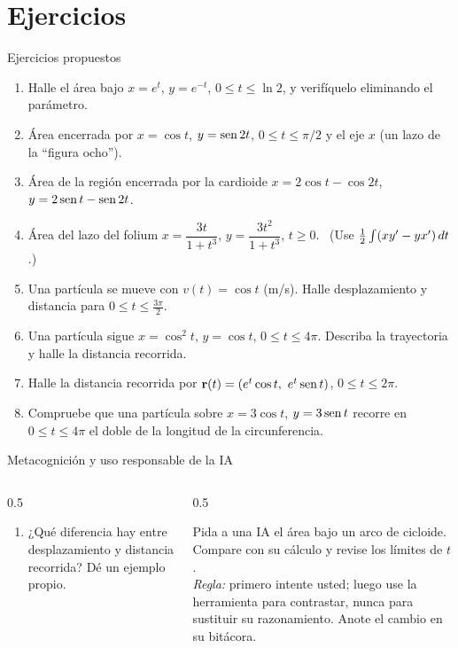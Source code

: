 \documentclass[10pt,aspectratio=169]{beamer}
\begin{document}
\section{Ejercicios}

\begin{frame}{Ejercicios propuestos}
  \begin{ejercicio}
    \begin{enumerate}
      \item Halle el área bajo $x=e^t$, $y=e^{-t}$, $0\le t\le\ln2$, y verifíquelo eliminando el parámetro.
      \item Área encerrada por $x=\cos t$, $y=\operatorname{sen}2t$, $0\le t\le\pi/2$ y el eje $x$ (un lazo de la ``figura ocho'').
      \item Área de la región encerrada por la cardioide $x=2\cos t-\cos2t$, $y=2\operatorname{sen} t-\operatorname{sen}2t$.
      \item Área del lazo del folium $x=\dfrac{3t}{1+t^3}$, $y=\dfrac{3t^2}{1+t^3}$, $t\ge0$.
        \ \small(Use $\frac12\int(xy'-yx')\,dt$.)
      \item Una partícula se mueve con $v(t)=\cos t$ (m/s). Halle desplazamiento y distancia para $0\le t\le\frac{3\pi}{2}$.
      \item Una partícula sigue $x=\cos^2t$, $y=\cos t$, $0\le t\le4\pi$. Describa la trayectoria y halle la distancia recorrida.
      \item Halle la distancia recorrida por $\mathbf r(t)=(e^t\cos t,\ e^t\operatorname{sen} t)$, $0\le t\le2\pi$.
      \item Compruebe que una partícula sobre $x=3\cos t$, $y=3\operatorname{sen} t$ recorre en $0\le t\le 4\pi$ el doble de la longitud de la circunferencia.
    \end{enumerate}
  \end{ejercicio}
\end{frame}

\begin{frame}{Metacognición y uso responsable de la IA}
  \small
  \begin{columns}[t]
    \begin{column}{0.5\textwidth}
      \begin{metacog}
        \begin{enumerate}
          \metacomun
          \item ¿Qué diferencia hay entre desplazamiento y distancia recorrida? Dé un ejemplo propio.
        \end{enumerate}
      \end{metacog}
    \end{column}
    \begin{column}{0.5\textwidth}
      \begin{iabox}
        Pida a una IA el área bajo un arco de cicloide. Compare con su cálculo y revise los límites de $t$.\\[2pt]
        \textit{Regla:} primero intente usted; luego use la herramienta para contrastar, nunca para sustituir su razonamiento. Anote el cambio en su bitácora.
      \end{iabox}
    \end{column}
  \end{columns}
\end{frame}
\end{document}
